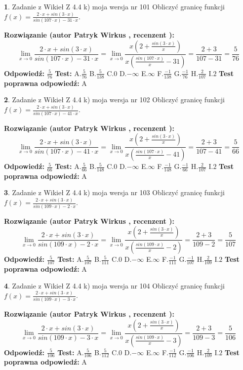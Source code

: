 \documentclass[12pt, a4paper]{article}
\theoremstyle{definition} %
\newtheorem{zad}{}
\newcommand{\zadStart}[1]{\begin{zad}#1\newline}
\newcommand{\zadStop}{\end{zad}}
\newcommand{\rozwStart}[2]{\noindent \textbf{Rozwiązanie (autor #1 , recenzent #2): }\newline}
\newcommand{\rozwStop}{\newline}
\newcommand{\odpStart}{\noindent \textbf{Odpowiedź:}\newline}
\newcommand{\odpStop}{\newline}
\newcommand{\testStart}{\noindent \textbf{Test:}\newline}
\newcommand{\testStop}{\newline}
\newcommand{\kluczStart}{\noindent \textbf{Test poprawna odpowiedź:}\newline}
\newcommand{\kluczStop}{\newline}
\begin{document}
\zadStart{Zadanie z Wikieł Z 4.4 k) moja wersja nr 101}
Obliczyć granicę funkcji $f(x)=\frac{2\cdot x +sin(3\cdot x)}{sin(107\cdot x) -31\cdot x}$.
\zadStop
\rozwStart{Patryk Wirkus}{}
$$\lim\limits_{x\to 0}\frac{2\cdot x +sin(3\cdot x)}{sin(107\cdot x) -31\cdot x}
=\lim\limits_{x\to 0}\frac{x(2+\frac{sin(3\cdot x)}{x})}{x(\frac{sin(107\cdot x)}{x}-31)}
=\frac{2+3}{107-31} = \frac{5}{76}$$
\rozwStop
\odpStart
$\frac{5}{76}$
\odpStop
\testStart
A.$\frac{5}{76}$
B.$\frac{5}{138}$
C.$0$
D.$-\infty$
E.$\infty$
F.$\frac{-1}{138}$
G.$\frac{-1}{76}$
H.$\frac{2}{107}$
I.$2$
\testStop
\kluczStart
A
\kluczStop



\zadStart{Zadanie z Wikieł Z 4.4 k) moja wersja nr 102}
Obliczyć granicę funkcji $f(x)=\frac{2\cdot x +sin(3\cdot x)}{sin(107\cdot x) -41\cdot x}$.
\zadStop
\rozwStart{Patryk Wirkus}{}
$$\lim\limits_{x\to 0}\frac{2\cdot x +sin(3\cdot x)}{sin(107\cdot x) -41\cdot x}
=\lim\limits_{x\to 0}\frac{x(2+\frac{sin(3\cdot x)}{x})}{x(\frac{sin(107\cdot x)}{x}-41)}
=\frac{2+3}{107-41} = \frac{5}{66}$$
\rozwStop
\odpStart
$\frac{5}{66}$
\odpStop
\testStart
A.$\frac{5}{66}$
B.$\frac{5}{148}$
C.$0$
D.$-\infty$
E.$\infty$
F.$\frac{-1}{148}$
G.$\frac{-1}{66}$
H.$\frac{2}{107}$
I.$2$
\testStop
\kluczStart
A
\kluczStop



\zadStart{Zadanie z Wikieł Z 4.4 k) moja wersja nr 103}
Obliczyć granicę funkcji $f(x)=\frac{2\cdot x +sin(3\cdot x)}{sin(109\cdot x) -2\cdot x}$.
\zadStop
\rozwStart{Patryk Wirkus}{}
$$\lim\limits_{x\to 0}\frac{2\cdot x +sin(3\cdot x)}{sin(109\cdot x) -2\cdot x}
=\lim\limits_{x\to 0}\frac{x(2+\frac{sin(3\cdot x)}{x})}{x(\frac{sin(109\cdot x)}{x}-2)}
=\frac{2+3}{109-2} = \frac{5}{107}$$
\rozwStop
\odpStart
$\frac{5}{107}$
\odpStop
\testStart
A.$\frac{5}{107}$
B.$\frac{5}{111}$
C.$0$
D.$-\infty$
E.$\infty$
F.$\frac{-1}{111}$
G.$\frac{-1}{107}$
H.$\frac{2}{109}$
I.$2$
\testStop
\kluczStart
A
\kluczStop



\zadStart{Zadanie z Wikieł Z 4.4 k) moja wersja nr 104}
Obliczyć granicę funkcji $f(x)=\frac{2\cdot x +sin(3\cdot x)}{sin(109\cdot x) -3\cdot x}$.
\zadStop
\rozwStart{Patryk Wirkus}{}
$$\lim\limits_{x\to 0}\frac{2\cdot x +sin(3\cdot x)}{sin(109\cdot x) -3\cdot x}
=\lim\limits_{x\to 0}\frac{x(2+\frac{sin(3\cdot x)}{x})}{x(\frac{sin(109\cdot x)}{x}-3)}
=\frac{2+3}{109-3} = \frac{5}{106}$$
\rozwStop
\odpStart
$\frac{5}{106}$
\odpStop
\testStart
A.$\frac{5}{106}$
B.$\frac{5}{112}$
C.$0$
D.$-\infty$
E.$\infty$
F.$\frac{-1}{112}$
G.$\frac{-1}{106}$
H.$\frac{2}{109}$
I.$2$
\testStop
\kluczStart
A
\kluczStop
\end{document}
